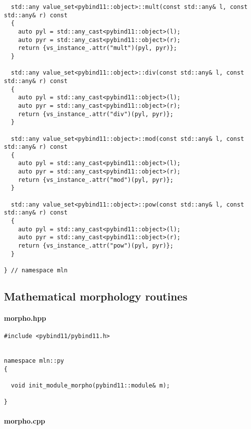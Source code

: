 \begin{verbatim}
  std::any value_set<pybind11::object>::mult(const std::any& l, const std::any& r) const
  {
    auto pyl = std::any_cast<pybind11::object>(l);
    auto pyr = std::any_cast<pybind11::object>(r);
    return {vs_instance_.attr("mult")(pyl, pyr)};
  }

  std::any value_set<pybind11::object>::div(const std::any& l, const std::any& r) const
  {
    auto pyl = std::any_cast<pybind11::object>(l);
    auto pyr = std::any_cast<pybind11::object>(r);
    return {vs_instance_.attr("div")(pyl, pyr)};
  }

  std::any value_set<pybind11::object>::mod(const std::any& l, const std::any& r) const
  {
    auto pyl = std::any_cast<pybind11::object>(l);
    auto pyr = std::any_cast<pybind11::object>(r);
    return {vs_instance_.attr("mod")(pyl, pyr)};
  }

  std::any value_set<pybind11::object>::pow(const std::any& l, const std::any& r) const
  {
    auto pyl = std::any_cast<pybind11::object>(l);
    auto pyr = std::any_cast<pybind11::object>(r);
    return {vs_instance_.attr("pow")(pyl, pyr)};
  }

} // namespace mln
\end{verbatim}


\subsection{Mathematical morphology routines}
\label{appendix:static-dynamic-bridge.mm.algos}

\paragraph{morpho.hpp}
\label{appendix:static-dynamic-bridge.mm.mropho.hpp}

\begin{verbatim}
#include <pybind11/pybind11.h>


namespace mln::py
{

  void init_module_morpho(pybind11::module& m);

}
\end{verbatim}

\paragraph{morpho.cpp}
\label{appendix:static-dynamic-bridge.mm.mropho.cpp}

